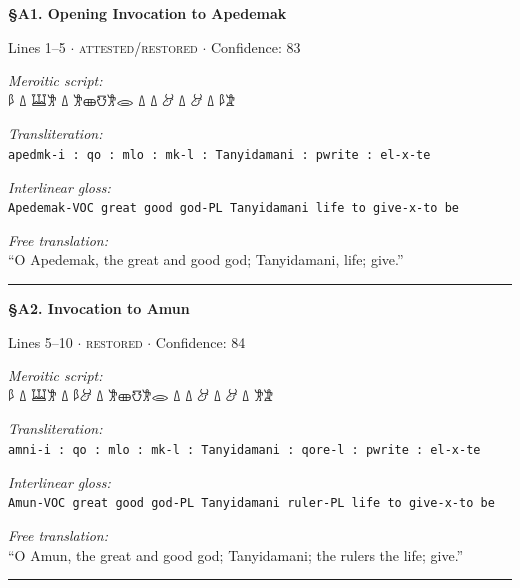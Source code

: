 \documentclass[11pt,a4paper]{article}
\begin{document}
\vspace{6pt}
\noindent\textbf{\S A1. Opening Invocation to Apedemak}
\hfill {\small Lines 1–5 $\cdot$ \textsc{attested/restored} $\cdot$ Confidence: 83%

\vspace{3pt}
\noindent\textit{Meroitic script:}\\[2pt]
{\meroitic 𐦀𐦁 𐦗 𐦃 𐦗 𐦃 𐦗  𐦗 𐦑𐦂𐦒𐦈𐦂 𐦗 𐦂𐦓 𐦗 𐦁}

\vspace{4pt}
\noindent\textit{Transliteration:}\\[2pt]
\texttt{apedmk-i : qo : mlo : mk-l : Tanyidamani : pwrite : el-x-te}

\vspace{4pt}
\noindent\textit{Interlinear gloss:}\\[2pt]
{\small\texttt{Apedemak-VOC  great  good  god-PL  Tanyidamani  life  to give-x-to be}}

\vspace{4pt}
\noindent\textit{Free translation:}\\[2pt]
``O Apedemak, the great and good god; Tanyidamani, life; give.''

\vspace{2pt}
\noindent\rule{\textwidth}{0.3pt}


\vspace{6pt}
\noindent\textbf{\S A2. Invocation to Amun}
\hfill {\small Lines 5–10 $\cdot$ \textsc{restored} $\cdot$ Confidence: 84%

\vspace{3pt}
\noindent\textit{Meroitic script:}\\[2pt]
{\meroitic 𐦀𐦂 𐦗 𐦃 𐦗 𐦃 𐦗  𐦗 𐦑𐦂𐦒𐦈𐦂 𐦗 𐦃𐦁 𐦗 𐦂𐦓 𐦗 𐦁}

\vspace{4pt}
\noindent\textit{Transliteration:}\\[2pt]
\texttt{amni-i : qo : mlo : mk-l : Tanyidamani : qore-l : pwrite : el-x-te}

\vspace{4pt}
\noindent\textit{Interlinear gloss:}\\[2pt]
{\small\texttt{Amun-VOC  great  good  god-PL  Tanyidamani  ruler-PL  life  to give-x-to be}}

\vspace{4pt}
\noindent\textit{Free translation:}\\[2pt]
``O Amun, the great and good god; Tanyidamani; the rulers the life; give.''

\vspace{2pt}
\noindent\rule{\textwidth}{0.3pt}


}}
\end{document}

